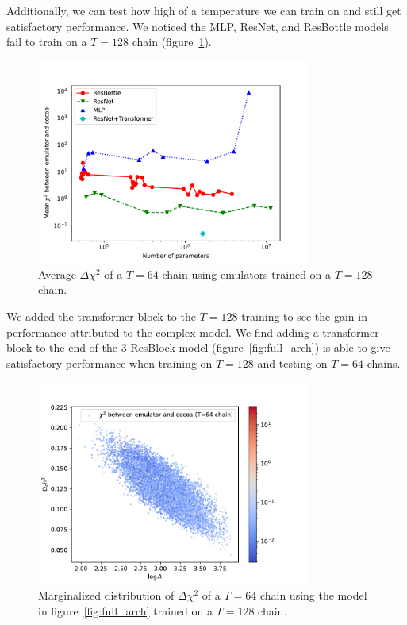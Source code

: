 Additionally, we can test how high of a temperature we can train on and still get satisfactory performance. We noticed the MLP, ResNet, and ResBottle models fail to train on a $T=128$ chain (figure~\ref{fig:avg_chi2_nparams_t128}).
\begin{figure}[!tb]
	\centering
	\includegraphics[width=0.8\textwidth]{plots/avg_chi2_v_n_params_T64.pdf}
	\caption{Average $\Delta\chi^2$ of a $T=64$ chain using emulators trained on a $T=128$ chain.}
	\label{fig:avg_chi2_nparams_t128}
\end{figure} 
We added the transformer block to the $T=128$ training to see the gain in performance attributed to the complex model. We find adding a transformer block to the end of the 3 ResBlock model (figure~\ref{fig:full_arch}) is able to give satisfactory performance when training on $T=128$ and testing on $T=64$ chains.
\begin{figure}[!tb]
	\centering
	\includegraphics[width=0.8\textwidth]{plots/T64_attention_stuff.pdf}
	\caption{Marginalized distribution of $\Delta\chi^2$ of a $T=64$ chain using the model in figure~\ref{fig:full_arch} trained on a $T=128$ chain.}
	\label{fig:testing_attention_t128}
\end{figure}

